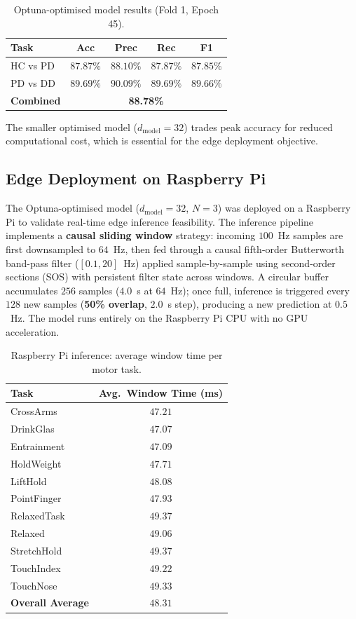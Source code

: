 \documentclass[conference]{IEEEtran}
\begin{document}
\begin{table}[H]
\centering
\caption{Optuna-optimised model results (Fold 1, Epoch 45).}
\label{tab:optuna_results}
\begin{tabular}{lcccc}
\toprule
\textbf{Task} & \textbf{Acc} & \textbf{Prec} & \textbf{Rec} & \textbf{F1} \\
\midrule
HC vs PD & $87.87\%$ & $88.10\%$ & $87.87\%$ & $87.85\%$ \\
PD vs DD & $89.69\%$ & $90.09\%$ & $89.69\%$ & $89.66\%$ \\
\midrule
\textbf{Combined} & \multicolumn{4}{c}{\textbf{88.78\%}} \\
\bottomrule
\end{tabular}
\end{table}

The smaller optimised model ($d_{\text{model}}{=}32$) trades peak accuracy for reduced computational cost, which is essential for the edge deployment objective.


\subsection{Edge Deployment on Raspberry Pi}
\label{sec:pi}

The Optuna-optimised model ($d_{\text{model}}{=}32$, $N{=}3$) was deployed on a Raspberry Pi to validate real-time edge inference feasibility. The inference pipeline implements a \textbf{causal sliding window} strategy: incoming $100$~Hz samples are first downsampled to $64$~Hz, then fed through a causal fifth-order Butterworth band-pass filter ($[0.1, 20]$~Hz) applied sample-by-sample using second-order sections (SOS) with persistent filter state across windows. A circular buffer accumulates $256$ samples ($4.0$~s at $64$~Hz); once full, inference is triggered every $128$ new samples (\textbf{50\% overlap}, $2.0$~s step), producing a new prediction at $0.5$~Hz. The model runs entirely on the Raspberry Pi CPU with no GPU acceleration.

\begin{table}[H]
\centering
\caption{Raspberry Pi inference: average window time per motor task.}
\label{tab:pi}
\begin{tabular}{lc}
\toprule
\textbf{Task} & \textbf{Avg.\ Window Time (ms)} \\
\midrule
CrossArms    & $47.21$ \\
DrinkGlas    & $47.07$ \\
Entrainment  & $47.09$ \\
HoldWeight   & $47.71$ \\
LiftHold     & $48.08$ \\
PointFinger  & $47.93$ \\
RelaxedTask  & $49.37$ \\
Relaxed      & $49.06$ \\
StretchHold  & $49.37$ \\
TouchIndex   & $49.22$ \\
TouchNose    & $49.33$ \\
\midrule
\textbf{Overall Average} & $\mathbf{48.31}$ \\
\bottomrule
\end{tabular}
\end{table}
\end{document}
